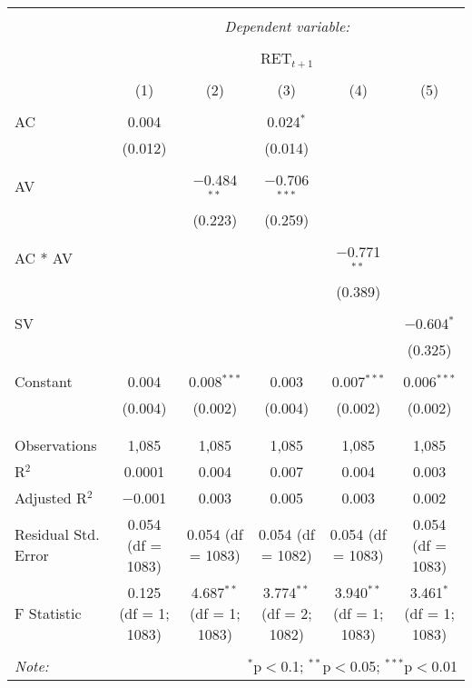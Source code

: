 
\begin{table}[!htbp] \centering 
  \caption{} 
  \label{} 
\begin{tabular}{@{\extracolsep{5pt}}lccccc} 
\\[-1.8ex]\hline 
\hline \\[-1.8ex] 
 & \multicolumn{5}{c}{\textit{Dependent variable:}} \\ 
\cline{2-6} 
\\[-1.8ex] & \multicolumn{5}{c}{RET$_{t+1}$} \\ 
\\[-1.8ex] & (1) & (2) & (3) & (4) & (5)\\ 
\hline \\[-1.8ex] 
 AC & 0.004 &  & 0.024$^{*}$ &  &  \\ 
  & (0.012) &  & (0.014) &  &  \\ 
  & & & & & \\ 
 AV &  & $-$0.484$^{**}$ & $-$0.706$^{***}$ &  &  \\ 
  &  & (0.223) & (0.259) &  &  \\ 
  & & & & & \\ 
 AC * AV &  &  &  & $-$0.771$^{**}$ &  \\ 
  &  &  &  & (0.389) &  \\ 
  & & & & & \\ 
 SV &  &  &  &  & $-$0.604$^{*}$ \\ 
  &  &  &  &  & (0.325) \\ 
  & & & & & \\ 
 Constant & 0.004 & 0.008$^{***}$ & 0.003 & 0.007$^{***}$ & 0.006$^{***}$ \\ 
  & (0.004) & (0.002) & (0.004) & (0.002) & (0.002) \\ 
  & & & & & \\ 
\hline \\[-1.8ex] 
Observations & 1,085 & 1,085 & 1,085 & 1,085 & 1,085 \\ 
R$^{2}$ & 0.0001 & 0.004 & 0.007 & 0.004 & 0.003 \\ 
Adjusted R$^{2}$ & $-$0.001 & 0.003 & 0.005 & 0.003 & 0.002 \\ 
Residual Std. Error & 0.054 (df = 1083) & 0.054 (df = 1083) & 0.054 (df = 1082) & 0.054 (df = 1083) & 0.054 (df = 1083) \\ 
F Statistic & 0.125 (df = 1; 1083) & 4.687$^{**}$ (df = 1; 1083) & 3.774$^{**}$ (df = 2; 1082) & 3.940$^{**}$ (df = 1; 1083) & 3.461$^{*}$ (df = 1; 1083) \\ 
\hline 
\hline \\[-1.8ex] 
\textit{Note:}  & \multicolumn{5}{r}{$^{*}$p$<$0.1; $^{**}$p$<$0.05; $^{***}$p$<$0.01} \\ 
\end{tabular} 
\end{table} 
